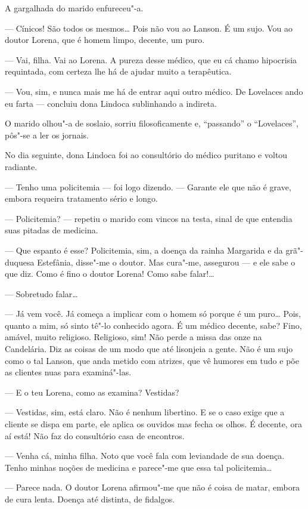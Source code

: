 A gargalhada do marido enfureceu"-a.

--- Cínicos! São todos os mesmos\ldots{} Pois não vou ao Lanson. É um sujo.
Vou ao doutor Lorena, que é homem limpo, decente, um puro.

--- Vai, filha. Vai ao Lorena. A pureza desse médico, que eu cá chamo
hipocrisia requintada, com certeza lhe há de ajudar muito a terapêutica.

--- Vou, sim, e nunca mais me há de entrar aqui outro médico. De
Lovelaces ando eu farta --- concluiu dona Lindoca sublinhando a
indireta.

O marido olhou"-a de soslaio, sorriu filosoficamente e, ``passando'' o
``Lovelaces'', pôs"-se a ler os jornais.

No dia seguinte, dona Lindoca foi ao consultório do médico puritano e
voltou radiante.

--- Tenho uma policitemia --- foi logo dizendo. --- Garante ele que não
é grave, embora requeira tratamento sério e longo.

--- Policitemia? --- repetiu o marido com vincos na testa, sinal de que
entendia suas pitadas de medicina.

--- Que espanto é esse? Policitemia, sim, a doença da rainha Margarida e
da grã"-duquesa Estefânia, disse"-me o doutor. Mas cura"-me, assegurou ---
e ele sabe o que diz. Como é fino o doutor Lorena! Como sabe falar!\ldots{}

--- Sobretudo falar\ldots{}

--- Já vem você. Já começa a implicar com o homem só porque é um puro\ldots{}
Pois, quanto a mim, só sinto tê"-lo conhecido agora. É um médico decente,
sabe? Fino, amável, muito religioso. Religioso, sim! Não perde a missa
das onze na Candelária. Diz as coisas de um modo que até lisonjeia a
gente. Não é um sujo como o tal Lanson, que anda metido com atrizes, que
vê humores em tudo e põe as clientes nuas para examiná"-las.

--- E o teu Lorena, como as examina? Vestidas?

--- Vestidas, sim, está claro. Não é nenhum libertino. E se o caso exige
que a cliente se dispa em parte, ele aplica os ouvidos mas fecha os
olhos. É decente, ora aí está! Não faz do consultório casa de encontros.

--- Venha cá, minha filha. Noto que você fala com leviandade de sua
doença. Tenho minhas noções de medicina e parece"-me que essa tal
policitemia\ldots{}

--- Parece nada. O doutor Lorena afirmou"-me que não é coisa de matar,
embora de cura lenta. Doença até distinta, de fidalgos.

